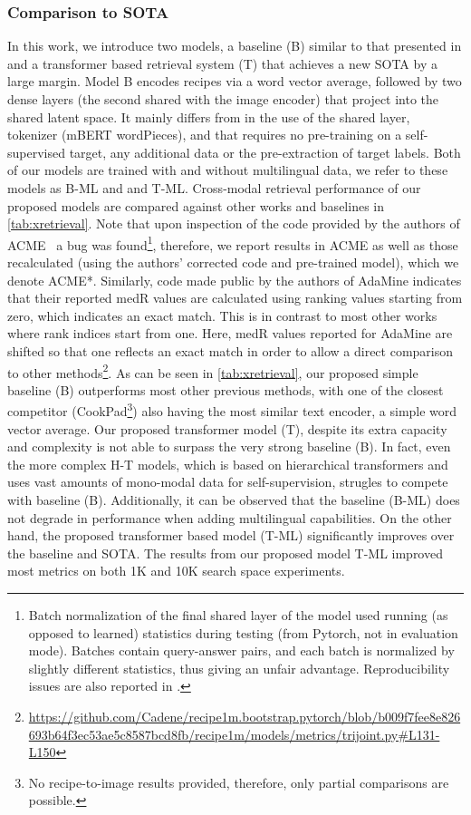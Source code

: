 \documentclass[sigconf,nonacm]{acmart}
\begin{document}
\subsubsection{\textbf{Comparison to SOTA}}

In this work, we introduce two models, a baseline (B) similar to that presented in \cite{Fain2019}
and a transformer based retrieval system (T) that achieves a new SOTA by a large margin. Model B encodes recipes via a word vector average, followed by two dense layers (the second shared with the image encoder) that project into the shared latent space. It mainly differs from  \cite{Fain2019} in the use of the shared layer, tokenizer (mBERT wordPieces), and that requires no pre-training on a self-supervised target, any additional data or the pre-extraction of target labels. Both of our models are trained with and without multilingual data, we refer to these models as B-ML and and T-ML. 
Cross-modal
retrieval performance of our proposed models are compared against other works and baselines in \autoref{tab:xretrieval}. 
Note
that upon inspection of the code provided by the authors of ACME~\cite{wang2019} a bug was found\footnote{Batch normalization of the final shared layer of the model used running (as opposed to learned) statistics during testing (from Pytorch, not in evaluation mode). Batches contain query-answer pairs, and each batch is normalized by slightly different statistics, thus giving an unfair advantage. Reproducibility issues are also reported in \cite{Fain2019}.}, therefore, we report results in ACME\cite{wang2019} as well as those recalculated (using the authors' corrected code and pre-trained model), which we denote ACME*. Similarly, code made public by the authors of AdaMine indicates that their reported medR values are calculated using ranking values starting from zero, which indicates an exact match. This is in contrast to most other works where rank indices start from one. Here, medR values reported for AdaMine are shifted so that one reflects an exact match in order to allow a direct comparison to other methods\footnote{\url{https://github.com/Cadene/recipe1m.bootstrap.pytorch/blob/b009f7fee8e826693b64f3ec53ae5c8587bcd8fb/recipe1m/models/metrics/trijoint.py\#L131-L150}}. As can be seen in \autoref{tab:xretrieval}, our proposed simple baseline (B) outperforms most other previous methods, with one of the closest competitor (CookPad\footnote{No recipe-to-image results provided, therefore, only partial comparisons are possible.}) also having the most similar text encoder, a simple word vector average. Our proposed transformer model (T), despite its extra capacity and complexity is not able to surpass the very strong baseline (B). In fact, even the more complex H-T \cite{salvador2021} models, which is based on hierarchical transformers and uses vast amounts of mono-modal data for self-supervision, strugles to compete with baseline (B). Additionally, it can be observed that the baseline (B-ML) does not degrade in performance when adding multilingual capabilities. On the other hand, the proposed transformer based model (T-ML) significantly improves over the baseline and SOTA. The results from our proposed model T-ML improved most metrics on both 1K and 10K search space experiments.  
\end{document}
